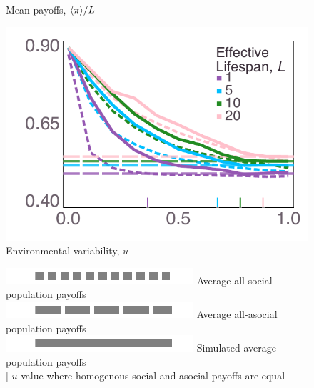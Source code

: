 \documentclass[letterpaper,11.5pt]{scrartcl}
\begin{document}
\begin{figure}
\begin{minipage}[]{0.4\textwidth}
\begin{rotate}{90}
{{            {\hspace{-7em} Mean payoffs, $\langle \pi \rangle / L$}
        }}
      \end{rotate}%
      \includegraphics[width=\textwidth]{Figures/mean_prev_net_payoff_over_u_lowpayoff=0.45_nbehaviors=10.pdf}
      \\[-0.8em]
      {\centering \quad Environmental variability, $u$}

    \end{minipage}

    \begin{center}
       \includegraphics[width=.75in]{Figures/legendElements/dot.pdf}
       { Average all-social population payoffs}  \\[.725em]
       \includegraphics[width=.75in]{Figures/legendElements/ldash.pdf} 
       { Average all-asocial population payoffs} \\[.725em]
       \includegraphics[width=.75in]{Figures/legendElements/solid.pdf} 
       { Simulated average population payoffs} \\[.725em]
       { $\pmb{|}$  \quad $u$ value where homogenous social and asocial payoffs
      are equal} 
    \end{center}
\end{figure}
\end{document}
